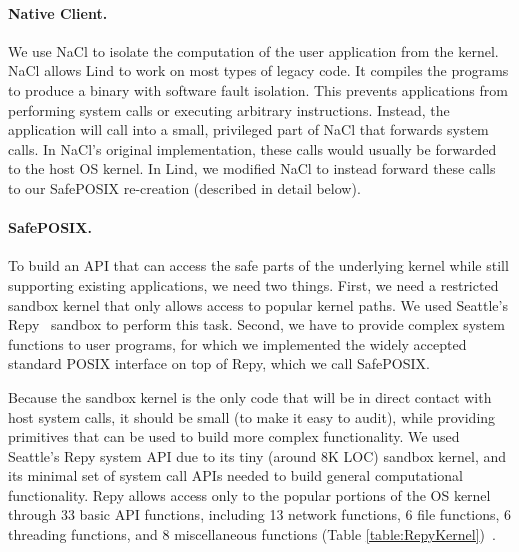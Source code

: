 \paragraph{Native Client.}
We use NaCl to isolate the computation of the user application
from the kernel. NaCl allows Lind to work on most types of legacy code.
It compiles the programs to produce a binary with software fault isolation.
This prevents applications from performing system calls
or executing arbitrary instructions.
Instead, the application will call into a small, privileged
part of NaCl that forwards system calls. In NaCl's original implementation,
these calls would usually be forwarded to the host OS kernel. In Lind, we
modified NaCl to instead forward these calls to our SafePOSIX re-creation 
(described in detail below).

\paragraph{SafePOSIX.}

To build an API that can access the safe parts of the underlying kernel while
still supporting existing applications, we need two things. First, we need a
restricted sandbox kernel that only allows access to popular kernel paths. We
used Seattle's Repy~\cite{Repy-10} sandbox to perform this task. Second, we
have to provide complex system functions to user programs,
for which we implemented the widely accepted standard POSIX interface on top of Repy, 
which we call SafePOSIX. 

Because the sandbox kernel is the only code that will be in direct contact with host
system calls, it should be small (to make it easy to audit), while providing
primitives that can be used to build more complex functionality.
We used Seattle's Repy system API due to its tiny (around 8K LOC) sandbox
kernel, and its minimal set of system call APIs needed to build general
computational functionality. Repy allows access only to the popular portions of
the OS kernel through 33 basic API functions, including 13 network functions, 6
file functions, 6 threading functions, and 8 miscellaneous functions (Table
\ref{table:RepyKernel})~\cite{Repy-10, RepyKernel}. 

